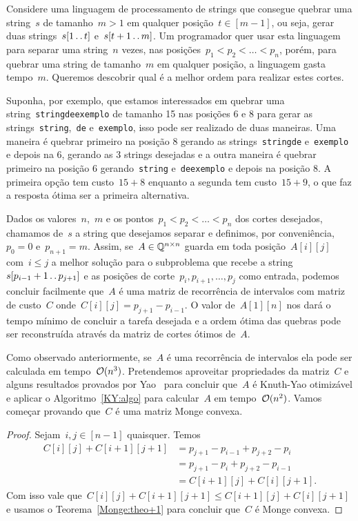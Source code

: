 Considere uma linguagem de processamento de strings que consegue quebrar uma string~$s$ de tamanho~$m > 1$ em qualquer posição~$t \in [m-1]$, ou seja, gerar duas strings~$s[1 \,.\,.\, t]$ e~$s[t+1 \,.\,.\, m]$. Um programador quer usar esta linguagem para separar uma string~$n$ vezes, nas posições~${p_1 < p_2 < \dots < p_{n}}$, porém, para quebrar uma string de tamanho~$m$ em qualquer posição, a linguagem gasta tempo~$m$. Queremos descobrir qual é a melhor ordem para realizar estes cortes. 

Suponha, por exemplo, que estamos interessados em quebrar uma string~\texttt{stringdeexemplo} de tamanho 15 nas posições 6 e 8 para gerar as strings~\texttt{string},~\texttt{de} e~\texttt{exemplo}, isso pode ser realizado de duas maneiras. Uma maneira é quebrar primeiro na posição 8 gerando as strings~\texttt{stringde} e~\texttt{exemplo} e depois na 6, gerando as 3 strings desejadas e a outra maneira é quebrar primeiro na posição 6 gerando~\texttt{string} e~\texttt{deexemplo} e depois na posição 8. A primeira opção tem custo~$15 + 8$ enquanto a segunda tem custo~$15 + 9$, o que faz a resposta ótima ser a primeira alternativa.

Dados os valores~$n$,~$m$ e os pontos~$p_1 < p_2 < \dots < p_{n}$ dos cortes desejados, chamamos de~$s$ a string que desejamos separar e definimos, por conveniência,~$p_0 = 0$ e~$p_{n+1} = m$. Assim, se~${A \in \mathbb{Q}^{n \times n}}$ guarda em toda posição~$A[i][j]$ com~$i \leq j$ a melhor solução para o subproblema que recebe a string~${s[p_{i-1} + 1 \,.\,.\, p_{j+1}]}$ e as posições de corte~$p_{i},p_{i+1},\dots,p_{j}$ como entrada, podemos concluir facilmente que~$A$ é uma matriz de recorrência de intervalos com matriz de custo~$C$ onde~$C[i][j] = p_{j+1} - p_{i-1}$. O valor de~$A[1][n]$ nos dará o tempo mínimo de concluir a tarefa desejada e a ordem ótima das quebras pode ser reconstruída através da matriz de cortes ótimos de~$A$.

Como observado anteriormente, se~$A$ é uma recorrência de intervalos ela pode ser calculada em tempo~$\mathcal{O}(n^3)$. Pretendemos aproveitar propriedades da matriz~$C$ e alguns resultados provados por Yao~\cite{Yao:1980} para concluir que~$A$ é Knuth-Yao otimizável e aplicar o Algoritmo~\ref{KY:algo} para calcular~$A$ em tempo~$\mathcal{O}(n^2)$. Vamos começar provando que~$C$ é uma matriz Monge convexa.

\begin{proof}
Sejam~$i,j \in [n-1]$ quaisquer. Temos 
\begin{align*}
    C[i][j] + C[i+1][j+1] &= p_{j+1} - p_{i-1} + p_{j+2} - p_{i} \\
                          &= p_{j+1} - p_{i} + p_{j+2} - p_{i-1} \\
                          &= C[i+1][j] + C[i][j+1] \text{.}
\end{align*}
Com isso vale que~$C[i][j] + C[i+1][j+1] \leq C[i+1][j] + C[i][j+1]$ e usamos o Teorema~\ref{Monge:theo+1} para concluir que~$C$ é Monge convexa.
\end{proof}

